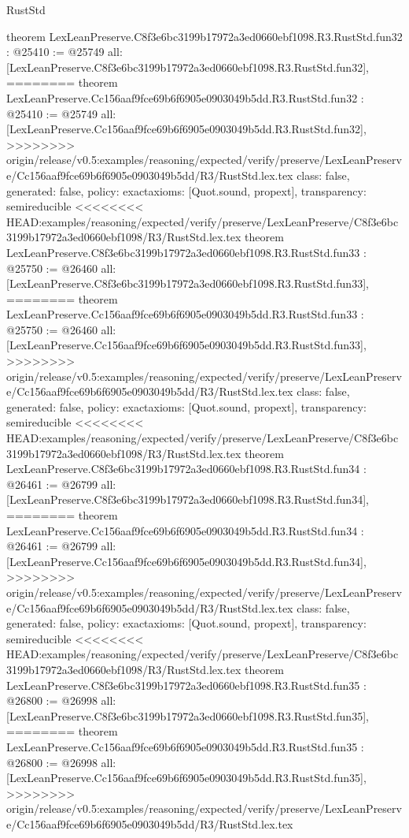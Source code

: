 \begin{lexlean}{RustStd}
\begin{coremodule}
{\begin{coremodule}
{{{{{{{{{{{{{{{{{{{{{{{{{{{{{{{{{{theorem LexLeanPreserve.C8f3e6bc3199b17972a3ed0660ebf1098.R3.RustStd.fun32 : @25410 := @25749 {
  all: [LexLeanPreserve.C8f3e6bc3199b17972a3ed0660ebf1098.R3.RustStd.fun32],
========
theorem LexLeanPreserve.Cc156aaf9fce69b6f6905e0903049b5dd.R3.RustStd.fun32 : @25410 := @25749 {
  all: [LexLeanPreserve.Cc156aaf9fce69b6f6905e0903049b5dd.R3.RustStd.fun32],
>>>>>>>> origin/release/v0.5:examples/reasoning/expected/verify/preserve/LexLeanPreserve/Cc156aaf9fce69b6f6905e0903049b5dd/R3/RustStd.lex.tex
  class: false,
  generated: false,
  policy: exact{axioms: [Quot.sound, propext]},
  transparency: semireducible
}
<<<<<<<< HEAD:examples/reasoning/expected/verify/preserve/LexLeanPreserve/C8f3e6bc3199b17972a3ed0660ebf1098/R3/RustStd.lex.tex
theorem LexLeanPreserve.C8f3e6bc3199b17972a3ed0660ebf1098.R3.RustStd.fun33 : @25750 := @26460 {
  all: [LexLeanPreserve.C8f3e6bc3199b17972a3ed0660ebf1098.R3.RustStd.fun33],
========
theorem LexLeanPreserve.Cc156aaf9fce69b6f6905e0903049b5dd.R3.RustStd.fun33 : @25750 := @26460 {
  all: [LexLeanPreserve.Cc156aaf9fce69b6f6905e0903049b5dd.R3.RustStd.fun33],
>>>>>>>> origin/release/v0.5:examples/reasoning/expected/verify/preserve/LexLeanPreserve/Cc156aaf9fce69b6f6905e0903049b5dd/R3/RustStd.lex.tex
  class: false,
  generated: false,
  policy: exact{axioms: [Quot.sound, propext]},
  transparency: semireducible
}
<<<<<<<< HEAD:examples/reasoning/expected/verify/preserve/LexLeanPreserve/C8f3e6bc3199b17972a3ed0660ebf1098/R3/RustStd.lex.tex
theorem LexLeanPreserve.C8f3e6bc3199b17972a3ed0660ebf1098.R3.RustStd.fun34 : @26461 := @26799 {
  all: [LexLeanPreserve.C8f3e6bc3199b17972a3ed0660ebf1098.R3.RustStd.fun34],
========
theorem LexLeanPreserve.Cc156aaf9fce69b6f6905e0903049b5dd.R3.RustStd.fun34 : @26461 := @26799 {
  all: [LexLeanPreserve.Cc156aaf9fce69b6f6905e0903049b5dd.R3.RustStd.fun34],
>>>>>>>> origin/release/v0.5:examples/reasoning/expected/verify/preserve/LexLeanPreserve/Cc156aaf9fce69b6f6905e0903049b5dd/R3/RustStd.lex.tex
  class: false,
  generated: false,
  policy: exact{axioms: [Quot.sound, propext]},
  transparency: semireducible
}
<<<<<<<< HEAD:examples/reasoning/expected/verify/preserve/LexLeanPreserve/C8f3e6bc3199b17972a3ed0660ebf1098/R3/RustStd.lex.tex
theorem LexLeanPreserve.C8f3e6bc3199b17972a3ed0660ebf1098.R3.RustStd.fun35 : @26800 := @26998 {
  all: [LexLeanPreserve.C8f3e6bc3199b17972a3ed0660ebf1098.R3.RustStd.fun35],
========
theorem LexLeanPreserve.Cc156aaf9fce69b6f6905e0903049b5dd.R3.RustStd.fun35 : @26800 := @26998 {
  all: [LexLeanPreserve.Cc156aaf9fce69b6f6905e0903049b5dd.R3.RustStd.fun35],
>>>>>>>> origin/release/v0.5:examples/reasoning/expected/verify/preserve/LexLeanPreserve/Cc156aaf9fce69b6f6905e0903049b5dd/R3/RustStd.lex.tex
}}}}}}}}}}}}}}}}}}}}}}}}}}}}}}}}}}}}}}}
\end{coremodule}}
\end{coremodule}
\end{lexlean}
